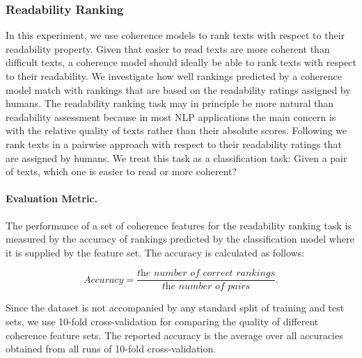\subsubsection{Readability Ranking}

In this experiment, we use coherence models to rank texts with respect to their readability property. 
Given that easier to read texts are more coherent than difficult texts, a coherence model should ideally be able to rank texts with respect to their readability. 
We investigate how well rankings predicted by a coherence model match with rankings that are based on the  readability ratings assigned by humans. 
The readability ranking task may in principle be more natural than readability assessment because in most NLP applications the main concern is with the relative quality of texts rather than their absolute scores. 
Following  we rank texts in a pairwise approach with respect to their readability ratings that are assigned by humans. 
We treat this task as a classification task: Given a pair of texts, which one is easier to read or more coherent?

\paragraph{Evaluation Metric.}
The performance of a set of coherence features for the readability ranking task is measured by the accuracy of rankings  predicted by the classification model where it is supplied by the feature set. 
The accuracy is calculated as follows:

\begin{equation}
Accuracy = \frac{\textit{the number of correct rankings}}{\textit{the number of pairs}}. 
\end{equation}

Since the dataset is not accompanied by any standard split of training and test sets, we use 10-fold cross-validation for comparing the quality of different coherence feature sets. 
The reported accuracy is the average over all accuracies obtained from all runs of 10-fold cross-validation. 

